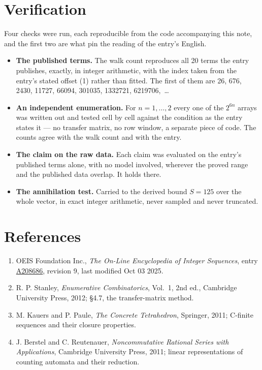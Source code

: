 \documentclass[11pt]{article}
\theoremstyle{definition}
\begin{document}
\section{Verification}

Four checks were run, each reproducible from the code accompanying this note, and the first two are what pin the reading of the entry's English.

\begin{itemize}

\item {\bfseries The published terms.} The walk count reproduces all 20 terms the entry publishes, exactly, in integer arithmetic, with the index taken from the entry's stated offset (1) rather than fitted. The first of them are 26, 676, 2430, 11727, 66094, 301035, 1332721, 6219706,~\dots

\item {\bfseries An independent enumeration.} For $n = 1,\dots,2$ every one of the $2^{6n}$ arrays was written out and tested cell by cell against the condition as the entry states it --- no transfer matrix, no row window, a separate piece of code. The counts agree with the walk count and with the entry.

\item {\bfseries The claim on the raw data.} Each claim was evaluated on the entry's published terms alone, with no model involved, wherever the proved range and the published data overlap. It holds there.

\item {\bfseries The annihilation test.} Carried to the derived bound $S = 125$ over the whole vector, in exact integer arithmetic, never sampled and never truncated.

\end{itemize}

\section{References}

\begin{enumerate}

\item OEIS Foundation Inc., \emph{The On-Line Encyclopedia of Integer Sequences}, entry \href{https://oeis.org/A208686}{A208686}, revision 9, last modified Oct 03 2025.

\item R. P. Stanley, \emph{Enumerative Combinatorics}, Vol.~1, 2nd ed., Cambridge University Press, 2012; \S4.7, the transfer-matrix method.

\item M. Kauers and P. Paule, \emph{The Concrete Tetrahedron}, Springer, 2011; C-finite sequences and their closure properties.

\item J. Berstel and C. Reutenauer, \emph{Noncommutative Rational Series with Applications}, Cambridge University Press, 2011; linear representations of counting automata and their reduction.

\end{enumerate}
\end{document}

